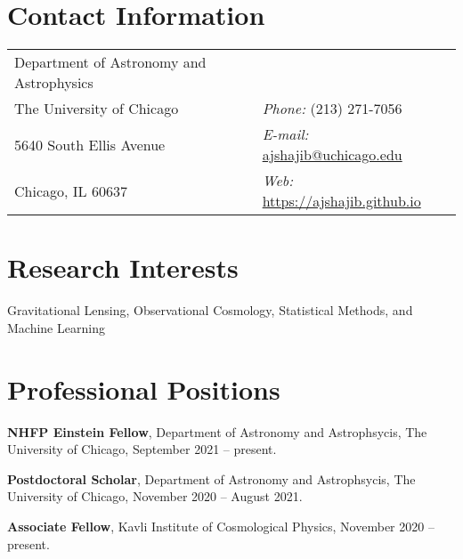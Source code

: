 \documentclass[margin, line]{res}
\newenvironment{list1}{
  \begin{list}{\ding{113}}{%
      \setlength{\itemsep}{0in}
      \setlength{\parsep}{0in} \setlength{\parskip}{0in}
      \setlength{\topsep}{0in} \setlength{\partopsep}{0in} 
      \setlength{\leftmargin}{0.17in}}}{\end{list}}
\begin{document}

\begin{resume}


\section{\sc Contact Information}
\vspace{.05in}
\begin{tabular}{@{}p{3in}p{3in}}                  
Department of Astronomy and Astrophysics  \\ %
The University of Chicago  & {\it Phone:}  (213) 271-7056 \\     
5640 South Ellis Avenue 	         & {\it E-mail:}  \href{mailto:ajshajib@astro.ucla.edu}{ajshajib@uchicago.edu} \\
Chicago, IL 60637  & {\it Web:} \url{https://ajshajib.github.io} \\   
\end{tabular}


\section{\sc Research Interests}
Gravitational Lensing, Observational Cosmology, Statistical Methods, and Machine Learning

\vspace*{2.5mm}
\section{\sc Professional Positions}

\vspace*{.16in}
\begin{list1}
	\item[] \textbf{NHFP Einstein Fellow}, Department of Astronomy and Astrophsycis, The University of Chicago, September 2021 -- present.
	\item[] \textbf{Postdoctoral Scholar}, Department of Astronomy and Astrophsycis, The University of Chicago, November 2020 -- August 2021.
	\item[] \textbf{Associate Fellow}, Kavli Institute of Cosmological Physics, November 2020 -- present.
\end{list1}

\vspace*{-.05in}



\end{resume}
\end{document}
